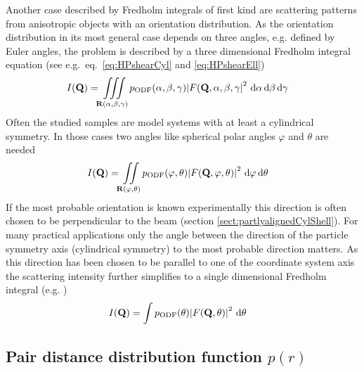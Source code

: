 Another case described by Fredholm integrals of first kind are scattering patterns from anisotropic objects with an orientation distribution. As the orientation distribution in its most general case depends on three angles, e.g. defined by Euler angles, the problem is described by a three dimensional Fredholm integral equation (see e.g.\ eq.\ \ref{eq:HPshearCyl} and \ref{eq:HPshearEll})
\begin{align}\label{eq:FE4ODF_3D}
  I(\mathbf{Q}) &=  \iiint\limits_{\mathbf{R}(\alpha,\beta,\gamma)} p_\mathrm{ODF}(\alpha,\beta,\gamma) \abs{F(\mathbf{Q},\alpha,\beta,\gamma}^2\,\, \mathrm{d}\alpha\, \mathrm{d}\beta\, \mathrm{d}\gamma
\end{align}
Often the studied samples are model systems with at least a cylindrical symmetry. In those cases two angles like spherical polar angles $\varphi$ and $\theta$ are needed
\begin{align}\label{eq:FE4ODF_2D}
  I(\mathbf{Q}) &=  \iint\limits_{\mathbf{R}(\varphi,\theta)} p_\mathrm{ODF}(\varphi,\theta) \abs{F(\mathbf{Q},\varphi,\theta)}^2\,\, \mathrm{d}\varphi\, \mathrm{d}\theta
\end{align}
If the most probable orientation is known experimentally this direction is often chosen to be perpendicular to the beam (section \ref{sect:partlyalignedCylShell}). For many practical applications only the angle between the direction of the particle symmetry axis (cylindrical symmetry) to the most probable direction matters. As this direction has been chosen to be parallel to one of the coordinate system axis the scattering intensity further simplifies to a single dimensional Fredholm integral (e.g. \cite{Beck2010})
\begin{align}\label{eq:FE4ODF_1D}
  I(\mathbf{Q}) &=  \int  p_\mathrm{ODF}(\theta) \abs{F(\mathbf{Q},\theta)}^2\,\, \mathrm{d}\theta
\end{align}
\subsection{Pair distance distribution function $p(r)$}~\\
\label{sec:p(r)}


